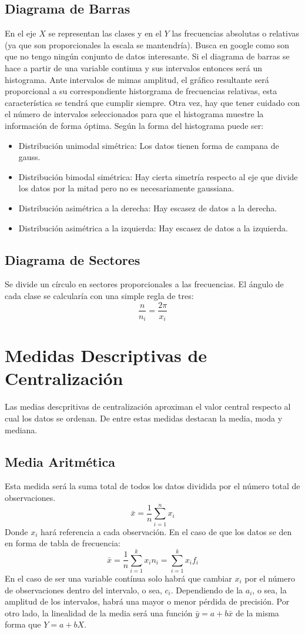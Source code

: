 \documentclass[10pt,a4paper]{book}
\begin{document}
\subsection{Diagrama de Barras}
En el eje $X$ se representan las clases y en el $Y$ las frecuencias absolutas o relativas (ya que son proporcionales la escala se mantendría). Busca en google como son que no tengo ningún conjunto de datos interesante. Si el diagrama de barras se hace a partir de una variable continua y sus intervalos entonces será un histograma. Ante intervalos de mimas amplitud, el gráfico resultante será proporcional a su correspondiente historgrama de frecuencias relativas, esta característica se tendrá que cumplir siempre. Otra vez, hay que tener cuidado con el número de intervalos seleccionados para que el histograma muestre la información de forma óptima. Según la forma del histograma puede ser:
\begin{itemize}
	\item Distribución unimodal simétrica: Los datos tienen forma de campana de gauss.
	\item Distribución bimodal simétrica: Hay cierta simetría respecto al eje que divide los datos por la mitad pero no es necesariamente gaussiana. 
	\item Distribución asimétrica a la derecha: Hay escasez de datos a la derecha.
	\item Distribución asimétrica a la izquierda: Hay escasez de datos a la izquierda. 
\end{itemize}
\subsection{Diagrama de Sectores}
Se divide un círculo en sectores proporcionales a las frecuencias. El ángulo de cada clase se calcularía con una simple regla de tres:
\[\frac{n}{n_i} = \frac{2\pi}{x_i}\]

\section{Medidas Descriptivas de Centralización}
Las medias descpritivas de centralización aproximan el valor central respecto al cual los datos se ordenan. De entre estas medidas destacan la media, moda y mediana.
\subsection{Media Aritmética}
Esta medida será la suma total de todos los datos dividida por el número total de observaciones. 
	\[\bar x = \frac{1}{n}\sum_{i=1}^nx_i\]
Donde $x_i$ hará referencia a cada observación. En el caso de que los datos se den en forma de tabla de frecuencia: 
	\[\bar x = \frac{1}{n}\sum_{i=1}^kx_in_i = \sum_{i=1}^kx_if_i\]
En el caso de ser una variable contínua solo habrá que cambiar $x_i$ por el número de observaciones dentro del intervalo, o sea, $c_i$. Dependiendo de la $a_i$, o sea, la amplitud de los intervalos, habrá una mayor o menor pérdida de precisión. Por otro lado, la linealidad de la media será una función $\bar y = a+b\bar x$ de la misma forma que $Y=a+bX$.
\end{document}
